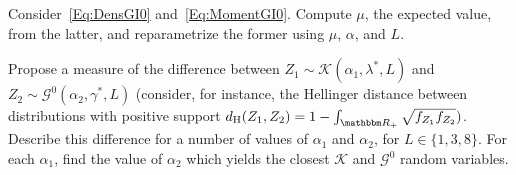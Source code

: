 \begin{exer}
Consider~\eqref{Eq:DensGI0} and~\eqref{Eq:MomentGI0}.
Compute $\mu$, the expected value, from the latter, and reparametrize the former using $\mu$, $\alpha$, and $L$.
\end{exer}

\begin{exer}\label{Ex:ApproximationKGI0}
Propose a measure of the difference between $Z_1\sim\mathcal K(\alpha_1,\lambda^*, L)$ and $Z_2\sim\mathcal G^0(\alpha_2,\gamma^*, L)$ (consider, for instance, the Hellinger distance between distributions with positive support $d_{\text{H}}(Z_1,Z_2)=1-\int_{\mathbbm R_+}\sqrt{f_{Z_1} f_{Z_2}})$.
Describe this difference for a number of values of $\alpha_1$ and $\alpha_2$, for $L\in\{1,3,8\}$.
For each $\alpha_1$, find the value of $\alpha_2$ which yields the closest $\mathcal K$ and $\mathcal G^0$ random variables\cite{mejailfreryjacobobustos2001}.
\end{exer}
